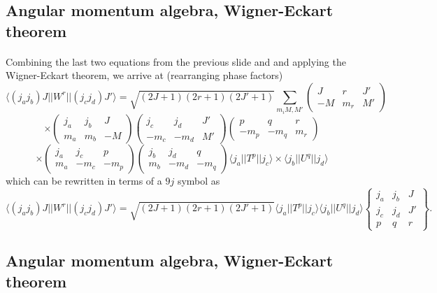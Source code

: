 \documentclass[%
twoside,                 %
final,                   %
10pt]{article}
\begin{document}
\subsection{Angular momentum algebra, Wigner-Eckart theorem}

\paragraph{}
Combining the last two equations from the previous slide and 
and applying the Wigner-Eckart theorem, we arrive at (rearranging phase factors)
\[
\langle (j_aj_b)J||W^{r}||(j_cj_d)J'\rangle=\sqrt{(2J+1)(2r+1)(2J'+1)}\sum_{m_iM,M'}\left(\begin{array}{ccc}  J & r & J' \\ -M & m_r & M'\end{array}\right)
\]
\[
\times\left(\begin{array}{ccc} j_a  &j_b  & J \\ m_a &m_b &-M \end{array}\right)
\left(\begin{array}{ccc} j_c  &j_d  &J'  \\ -m_c &-m_d &M' \end{array}\right)
\left(\begin{array}{ccc} p  & q & r \\  -m_p&-m_q &m_r \end{array}\right)
\]
\[
\times\left(\begin{array}{ccc} j_a  &j_c  &p  \\ m_a &-m_c &-m_p \end{array}\right)\left(\begin{array}{ccc} j_b  &j_d  &q  \\ m_b &-m_d &-m_q \end{array}\right)\langle j_a||T^p||j_c\rangle \times \langle j_b||U^q||j_d\rangle
\]
which can be rewritten in terms of a $9j$ symbol as 
\[
\langle (j_aj_b)J||W^{r}||(j_cj_d)J'\rangle=\sqrt{(2J+1)(2r+1)(2J'+1)}\langle j_a||T^p||j_c\rangle  \langle j_b||U^q||j_d\rangle\left\{\begin{array}{ccc} j_a & j_b& J \\ j_c & j_d & J' \\ p & q& r\end{array}\right\}.
\]



\subsection{Angular momentum algebra, Wigner-Eckart theorem}
\end{document}
